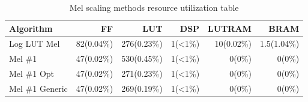 \begin{table}[H]
    \centering
\begin{tabular}{ !{\color{ytblborder}\vrule}l!{\color{ytblborder}\vrule}rrrrr| } 
    \hline

    \hline
     \color{white}\bf{Algorithm} 
    & \color{white}\bf{FF} 
    & \color{white}\bf{LUT} 
    & \color{white}\bf{DSP} 
    & \color{white}\bf{LUTRAM} 
    & \color{white}\bf{BRAM} \\
    \hline

    \hline
     Log LUT Mel   & 82(0.04\%) & 276(0.23\%) & 1(<1\%) & 10(0.02\%) & 1.5(1.04\%)  \\
    \hline
    
    \hline
     Mel \#1     & 47(0.02\%) & 530(0.45\%) & 1(<1\%) & 0(0\%)  & 0(0\%)    \\
    \hline
    
    \hline
     Mel \#1 Opt      & 47(0.02\%) & 271(0.23\%) & 1(<1\%) & 0(0\%)  & 0(0\%)    \\
    \hline

    \hline
     Mel \#1 Generic     & \color{gtblcaption}47(0.02\%) & \color{gtblcaption}269(0.19\%) & \color{gtblcaption}1(<1\%) & \color{gtblcaption}0(0\%)  & \color{gtblcaption}0(0\%)    \\
    \hline

    \hline
\end{tabular}
\caption{Mel scaling methods resource utilization table}
\label{tbl:mel_resource_util}
\end{table}



